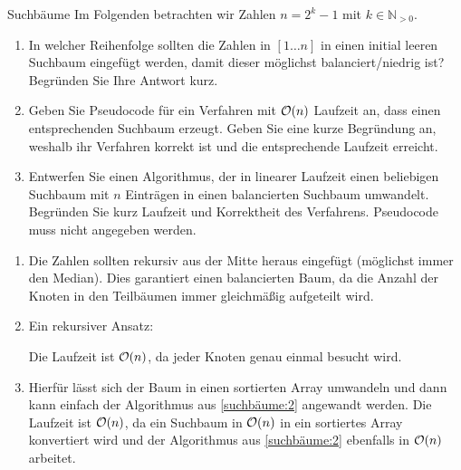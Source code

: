 \documentclass{article}
\begin{document}
\begin{exercise}{Suchbäume}
  Im Folgenden betrachten wir Zahlen $n = 2^k - 1$ mit $k \in \mathbb{N}_{>0}$.
  \begin{enumerate}
    \item In welcher Reihenfolge sollten die Zahlen in $[1\dots n]$ in einen initial leeren Suchbaum eingefügt werden, damit dieser möglichst balanciert/niedrig ist? Begründen Sie Ihre Antwort kurz.
    \item\label{suchbäume:2} Geben Sie Pseudocode für ein Verfahren mit $\mathcal{O}(n)$ Laufzeit an, dass einen entsprechenden Suchbaum erzeugt. Geben Sie eine kurze Begründung an, weshalb ihr Verfahren korrekt ist und die entsprechende Laufzeit erreicht.
    \item Entwerfen Sie einen Algorithmus, der in linearer Laufzeit einen beliebigen Suchbaum mit $n$ Einträgen in einen balancierten Suchbaum umwandelt. Begründen Sie kurz Laufzeit und Korrektheit des Verfahrens. Pseudocode muss nicht angegeben werden.
  \end{enumerate}

  \begin{solution}
    \begin{enumerate}
      \item Die Zahlen sollten rekursiv aus der Mitte heraus eingefügt (möglichst immer den Median). Dies garantiert einen balancierten Baum, da die Anzahl der Knoten in den Teilbäumen immer gleichmäßig aufgeteilt wird.
      \item Ein rekursiver Ansatz:\par
            
            Die Laufzeit ist $\mathcal{O}(n)$, da jeder Knoten genau einmal besucht wird.
      \item Hierfür lässt sich der Baum in einen sortierten Array umwandeln und dann kann einfach der Algorithmus aus \ref{suchbäume:2} angewandt werden. Die Laufzeit ist $\mathcal{O}(n)$, da ein Suchbaum in $\mathcal{O}(n)$ in ein sortiertes Array konvertiert wird und der Algorithmus aus \ref{suchbäume:2} ebenfalls in $\mathcal{O}(n)$ arbeitet.
    \end{enumerate}
  \end{solution}
\end{exercise}
\end{document}
